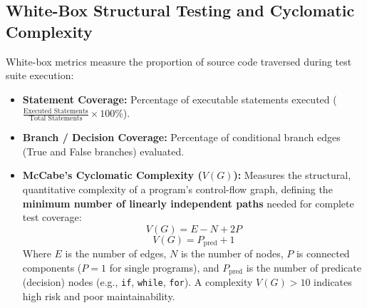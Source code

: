 \subsection{White-Box Structural Testing and Cyclomatic Complexity}
White-box metrics measure the proportion of source code traversed during test suite execution:
\begin{itemize}
    \item \textbf{Statement Coverage:} Percentage of executable statements executed ($\frac{\text{Executed Statements}}{\text{Total Statements}} \times 100\%$).
    \item \textbf{Branch / Decision Coverage:} Percentage of conditional branch edges (True and False branches) evaluated.
    \item \textbf{McCabe's Cyclomatic Complexity ($V(G)$):} Measures the structural, quantitative complexity of a program's control-flow graph, defining the \textbf{minimum number of linearly independent paths} needed for complete test coverage:
    \begin{equation}
    \boxed{V(G) = E - N + 2P}
    \end{equation}
    \begin{equation}
    \boxed{V(G) = P_{\text{pred}} + 1}
    \end{equation}
    Where $E$ is the number of edges, $N$ is the number of nodes, $P$ is connected components ($P=1$ for single programs), and $P_{\text{pred}}$ is the number of predicate (decision) nodes (e.g., \texttt{if}, \texttt{while}, \texttt{for}). A complexity $V(G) > 10$ indicates high risk and poor maintainability.
\end{itemize}

